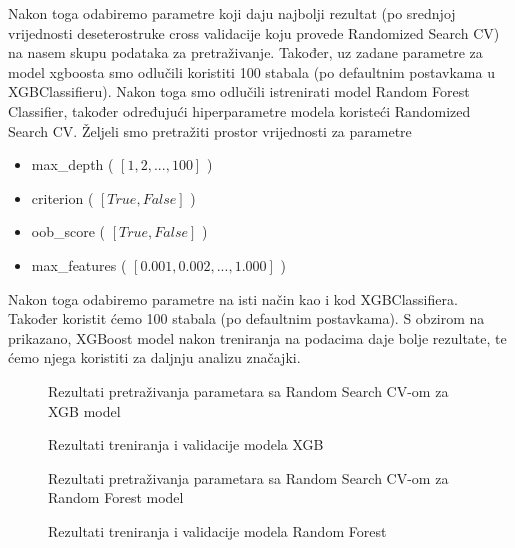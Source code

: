 \documentclass[conference]{IEEEtran}
\newlength\figureheight
\newlength\figurewidth
\begin{document}
Nakon toga odabiremo parametre koji daju najbolji rezultat (po srednjoj vrijednosti deseterostruke cross validacije koju provede Randomized Search CV) na nasem skupu podataka za pretraživanje. Također, uz zadane parametre za model xgboosta smo odlučili koristiti 100 stabala (po defaultnim postavkama u XGBClassifieru).
Nakon toga smo odlučili istrenirati model Random Forest Classifier, također određujući hiperparametre modela koristeći Randomized Search CV. Željeli smo pretražiti prostor vrijednosti za parametre 
\begin{itemize} 
\item max\_depth ( $[1, 2,..., 100]$ )
\item criterion ( $[True, False]$ )
\item oob\_score ( $[True, False]$ )
\item max\_features ( $[0.001, 0.002,..., 1.000] $ )
\end{itemize}
Nakon toga odabiremo parametre na isti način kao i kod XGBClassifiera. Također koristit ćemo 100 stabala (po defaultnim postavkama).
S obzirom na prikazano, XGBoost model nakon treniranja na podacima daje bolje rezultate, te ćemo njega koristiti za daljnju analizu značajki.
\setlength\figureheight{2.5in}
\setlength\figurewidth{3.5in}
\begin{figure}[h]
\caption{Rezultati pretraživanja parametara sa Random Search CV-om za XGB model}
\end{figure}
\begin{figure}[h]
\caption{Rezultati treniranja i validacije modela XGB}
\end{figure}
\begin{figure}[h]
\caption{Rezultati pretraživanja parametara sa Random Search CV-om za Random Forest model}
\end{figure}
\begin{figure}[h]
\caption{Rezultati treniranja i validacije modela Random Forest}
\end{figure}
\end{document}
